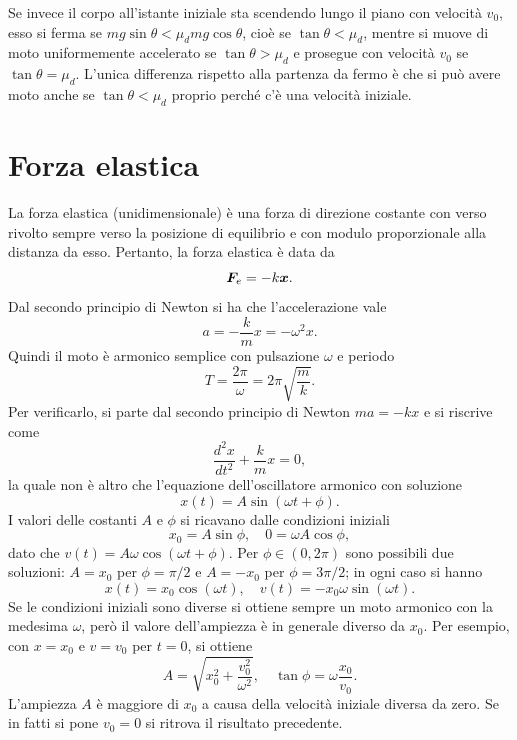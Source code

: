 Se invece il corpo all'istante iniziale sta scendendo lungo il piano con velocità $v_0$, esso si ferma se $mg\sin{\theta}<\mu_{d}mg\cos{\theta}$, cioè se $\tan{\theta}<\mu_{d}$, mentre si muove di moto uniformemente accelerato se $\tan{\theta}>\mu_{d}$ e prosegue con velocità $v_0$ se $\tan{\theta}=\mu_{d}$. L'unica differenza rispetto alla partenza da fermo è che si può avere moto anche se $\tan{\theta}<\mu_{d}$ proprio perché c'è una velocità iniziale.

\section{Forza elastica}
La forza elastica (unidimensionale) è una forza di direzione costante con verso rivolto sempre verso la posizione di equilibrio e con modulo proporzionale alla distanza da esso. Pertanto, la forza elastica è data da
\begin{equation}
    \bm{F}_e=-k\bm{x}.
\end{equation}
Dal secondo principio di Newton si ha che l'accelerazione vale
\begin{equation}
    a=-\frac{k}{m}x=-\omega^2x.
\end{equation}
Quindi il moto è armonico semplice con pulsazione $\omega$ e periodo
\begin{equation}
    T=\frac{2\pi}{\omega}=2\pi\sqrt{\frac{m}{k}}.
\end{equation}
Per verificarlo, si parte dal secondo principio di Newton $ma=-kx$ e si riscrive come
\begin{equation}
        \frac{d^2x}{dt^2}+\frac{k}{m}x=0,
\end{equation}
la quale non è altro che l'equazione dell'oscillatore armonico con soluzione
\begin{equation}
    x(t)=A\sin{(\omega t+\phi)}.
\end{equation}
I valori delle costanti $A$ e $\phi$ si ricavano dalle condizioni iniziali
\begin{equation}
    x_0=A\sin{\phi},\quad 0=\omega A\cos{\phi},
\end{equation}
dato che $v(t)=A\omega\cos{(\omega t+\phi)}$. Per $\phi\in(0,2\pi)$ sono possibili due soluzioni: $A=x_0$ per $\phi=\pi/2$ e $A=-x_0$ per $\phi=3\pi/2$; in ogni caso si hanno
\begin{equation}
    x(t)=x_0\cos{(\omega t)},\quad v(t)=-x_0\omega\sin{(\omega t)}.
\end{equation}
Se le condizioni iniziali sono diverse si ottiene sempre un moto armonico con la medesima $\omega$, però il valore dell'ampiezza è in generale diverso da $x_0$. Per esempio, con $x=x_0$ e $v=v_0$ per $t=0$, si ottiene
\begin{equation}
    A=\sqrt{x_0^2+\frac{v_0^2}{\omega^2}},\quad\tan{\phi}=\omega\frac{x_0}{v_0}.
\end{equation}
L'ampiezza $A$ è maggiore di $x_0$ a causa della velocità iniziale diversa da zero. Se in fatti si pone $v_0=0$ si ritrova il risultato precedente. 


